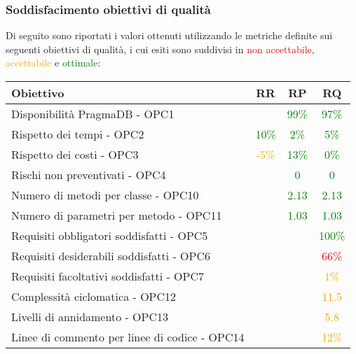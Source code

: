 \documentclass[PdQ.tex]{subfiles}
\begin{document}
\subsubsection{Soddisfacimento obiettivi di qualità}
			Di seguito sono riportati i valori ottenuti utilizzando le metriche definite sui seguenti obiettivi di qualità, i cui esiti sono suddivisi in \textcolor{red}{non accettabile}, \textcolor{orange}{accettabile} e \textcolor{green}{ottimale}:
			\begin{table}[h]
				\centering
				\begin{tabular}{l c c c}
					\hline
					\rule[-0.3cm]{0cm}{0.8cm}
					\textbf{Obiettivo} & \textbf{RR} & \textbf{RP} & \textbf{RQ}\\
					\hline
					\rule[0cm]{0cm}{0.4cm}
					Disponibilità PragmaDB - OPC1 & & \textcolor{green}{99\%} & \textcolor{green}{97\%} \\
					\rule[0cm]{0cm}{0.4cm}
					Rispetto dei tempi - OPC2 & \textcolor{green}{10\%} & \textcolor{green}{2\%} & \textcolor{green}{5\%} \\
					\rule[0cm]{0cm}{0.4cm}
					Rispetto dei costi - OPC3 & \textcolor{orange}{-5\%} & \textcolor{green}{13\%} & \textcolor{green}{0\%}\\
					\rule[0cm]{0cm}{0.4cm}
					Rischi non preventivati - OPC4 & & \textcolor{green}{0} & \textcolor{green}{0}\\
					\rule[0cm]{0cm}{0.4cm}
					Numero di metodi per classe - OPC10 & & \textcolor{green}{2.13} & \textcolor{green}{2.13} \\
					\rule[0cm]{0cm}{0.4cm}
					Numero di parametri per metodo - OPC11 & & \textcolor{green}{1.03} & \textcolor{green}{1.03}\\
					\rule[0cm]{0cm}{0.4cm}
					Requisiti obbligatori soddisfatti - OPC5 & & & \textcolor{green}{100\%} \\
					\rule[0cm]{0cm}{0.4cm}
					Requisiti desiderabili soddisfatti - OPC6 & & & \textcolor{red}{66\%} \\
					\rule[0cm]{0cm}{0.4cm}
					Requisiti facoltativi soddisfatti - OPC7 & & & \textcolor{orange}{1\%} \\
					\rule[0cm]{0cm}{0.4cm}
					Complessità ciclomatica - OPC12 & & & \textcolor{orange}{11.5} \\
					\rule[0cm]{0cm}{0.4cm}
					Livelli di annidamento - OPC13 & & & \textcolor{orange}{5.8} \\
					\rule[0cm]{0cm}{0.4cm}
					Linee di commento per linee di codice - OPC14 & & & \textcolor{orange}{12\%} \\

\end{tabular}
\end{table}
\end{document}
